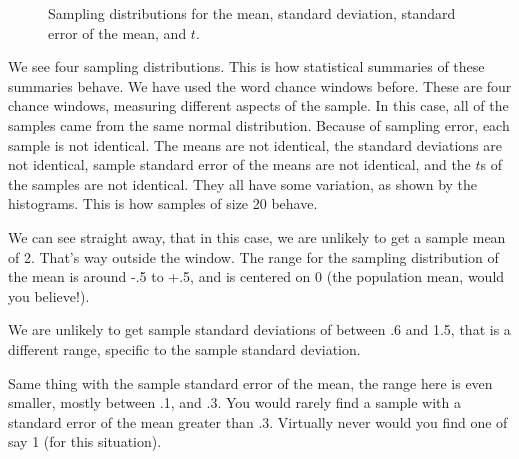 \documentclass[
  letterpaper,
  DIV=11,
  numbers=noendperiod]{scrreprt}
\begin{document}
\begin{figure}


\caption{\label{fig-7sampdists}Sampling distributions for the mean,
standard deviation, standard error of the mean, and \(t\).}

\end{figure}%

We see four sampling distributions. This is how statistical summaries of
these summaries behave. We have used the word chance windows before.
These are four chance windows, measuring different aspects of the
sample. In this case, all of the samples came from the same normal
distribution. Because of sampling error, each sample is not identical.
The means are not identical, the standard deviations are not identical,
sample standard error of the means are not identical, and the \(t\)s of
the samples are not identical. They all have some variation, as shown by
the histograms. This is how samples of size 20 behave.

We can see straight away, that in this case, we are unlikely to get a
sample mean of 2. That's way outside the window. The range for the
sampling distribution of the mean is around -.5 to +.5, and is centered
on 0 (the population mean, would you believe!).

We are unlikely to get sample standard deviations of between .6 and 1.5,
that is a different range, specific to the sample standard deviation.

Same thing with the sample standard error of the mean, the range here is
even smaller, mostly between .1, and .3. You would rarely find a sample
with a standard error of the mean greater than .3. Virtually never would
you find one of say 1 (for this situation).
\end{document}
